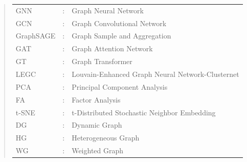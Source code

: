 \documentclass[ %
                    author={Tengyao Tu},
                supervisor={Dr. James Pope},
                    degree={MSc},
                     title={A New Perspective on Graph Community Detection: Combining Traditional Methods with Deep Learning Approaches},
                  subtitle={Applying to Telecom Networks and Diverse Datasets},
                      type={},
                      year={2024}]{dissertation}
\begin{document}
\begin{quote}
\noindent
\begin{tabular}{lcl}
GNN                 &:     &  Graph Neural Network                                         \\
GCN                &:     &  Graph Convolutional Network                                         \\
GraphSAGE                &:     &  Graph Sample and Aggregation                                     \\
GAT                &:     &  Graph Attention Network                                    \\
GT                &:     &   Graph Transformer                                    \\
LEGC                 &:     & Louvain-Enhanced Graph Neural Network-Clusternet                                         \\
PCA                &:     &   Principal Component Analysis                                    \\
FA               &:     &    Factor Analysis                                    \\
t-SNE               &:     &    t-Distributed Stochastic Neighbor Embedding                                   \\
DG              &:     &     Dynamic Graph                                   \\
HG              &:     &     Heterogeneous Graph                                  \\
WG              &:     &     Weighted Graph                                  \\


\end{tabular}
\end{quote}
\end{document}
